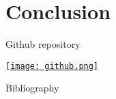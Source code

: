 \section{Conclusion}

\begin{frame}{Github repository}
	\begin{center}
		\href{https://github.com/lucasamtaylor01/Lorenz80/blob/master/01_src/simulacoes.ipynb}{
			\texttt{[image: github.png]}}
	\end{center}
	
\end{frame}
\begin{frame}[allowframebreaks]{Bibliography}
	\nocite{*}
	\printbibliography[heading=none]
\end{frame}